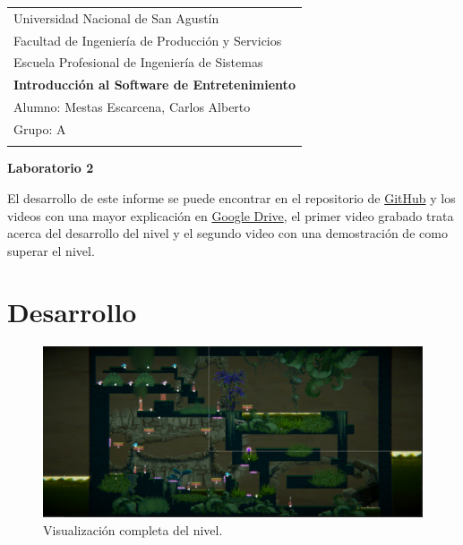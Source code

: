 \documentclass[a4paper,12pt]{article}
\begin{document}
\thispagestyle{empty}

\begin{tabular}{p{15.5cm}} 
\large Universidad Nacional de San Agustín \\ 
\large Facultad de Ingeniería de Producción y Servicios \\
\large Escuela Profesional de Ingeniería de Sistemas \\
{\LARGE \bf Introducción al Software de Entretenimiento} \\
\vspace{1mm}
Alumno: Mestas Escarcena, Carlos Alberto \\
Grupo: A \\
\hline \\
\end{tabular} 

\begin{center} 
	{\LARGE \bf Laboratorio 2}
	\vspace{2mm}
\end{center}  

El desarrollo de este informe se puede encontrar en el repositorio de \textcolor{blue}{
    \href{https://github.com/CarlosMestas/IDSE_CarlosMestas_Laboratorio2}{GitHub}} y los videos con una mayor explicación en \textcolor{blue}{
    \href{https://drive.google.com/drive/folders/1o1PGTRtjRTngNK9nAKqZac3Yk3iThDme?usp=sharing}{Google Drive}}, el primer video grabado trata acerca del desarrollo del nivel y el segundo video con una demostración de como superar el nivel.
    
\section*{Desarrollo}

    \begin{figure}[ht]
        \centering                \includegraphics[width=1\textwidth]{images/CaptureIDSE01.PNG}
        \caption{Visualización completa del nivel.}
    \end{figure}
\end{document}
